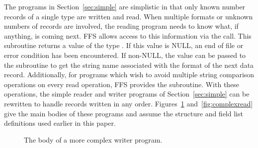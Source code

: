 The programs in Section~\ref{sec:simple} are simplistic in that only known
number records of a single type are written and read.  When multiple formats
or unknown numbers of records are involved, the reading program needs to know
what, if anything, is coming next.  FFS allows access to this information via
the  call.  This subroutine returns a value of the
type .  If this value is NULL, an end of file or error condition has
been encountered.  If non-NULL, the value can be passed to the subroutine
 to get the string name associated with the format of
the next data record.  Additionally, for programs which wish to avoid multiple
string comparison operations on every read operation, FFS provides the
 subroutine.  With these operations, the simple
reader and writer programs of Section~\ref{sec:simple} can be rewritten to
handle records written in any order.  Figures~\ref{fig:complexwrite}
and~\ref{fig:complexread} give the main bodies of these programs and assume the
structure and field list definitions used earlier in this paper.
\begin{figure}
\caption{The body of a more complex writer program.\label{fig:complexwrite}}
\end{figure}
